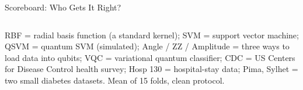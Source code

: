 \documentclass[aspectratio=169,10pt,t,xcolor={table,dvipsnames}]{beamer}
\begin{document}
\begin{frame}{Scoreboard: Who Gets It Right?}
\begin{columns}[c]
  \end{columns}
  \vfill
  {\tiny RBF = radial basis function (a standard kernel); SVM = support vector machine; QSVM = quantum SVM (simulated); Angle / ZZ / Amplitude = three ways to load data into qubits; VQC = variational quantum classifier; CDC = US Centers for Disease Control health survey; Hosp 130 = hospital-stay data; Pima, Sylhet = two small diabetes datasets. Mean of 15 folds, clean protocol.}
\end{frame}
\end{document}
